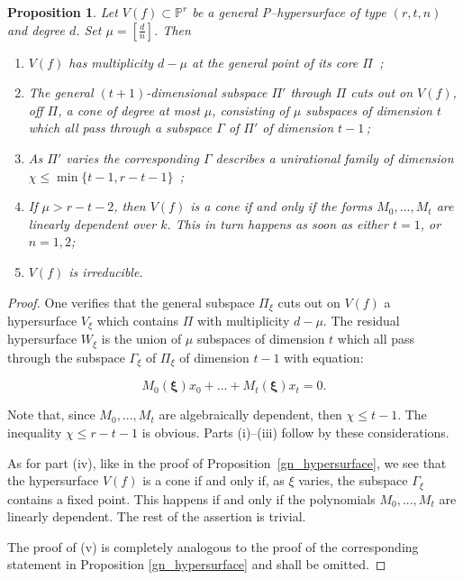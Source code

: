 \documentclass[11pt]{article}   %
\newtheorem{Proposition}[Theorem]{Proposition}
\theoremstyle{definition}
\numberwithin{Theorem}{section} \numberwithin{equation}{section}
\newcommand{\p}{{\mathbb P}}
\begin{document}
{\begin{Proposition}\label{Pcarat} Let $V(f)\subset\p^r$ be a general {\rm P}--hypersurface
of type $(r,t,n)$ and degree $d$. Set $\mu= [\frac dn]$. Then
\begin{enumerate}
\item[{\rm (i)}] $V(f)$ has multiplicity  $d-\mu$ at the general point
of its core $\Pi \,$ {\rm ;}
\item[{\rm (ii)}]  The general $(t+1)$-dimensional subspace $\Pi'$ through
$\Pi$ cuts out on $V(f)$, off $\Pi$, a cone of degree at most $\mu$,
consisting of  $\mu$ subspaces of dimension $t$ which all pass
through a subspace $\Gamma$ of $\Pi'$ of dimension
$t-1\,${\rm ;}
\item[{\rm (iii)}]   As $\Pi'$ varies the corresponding $\Gamma$ describes a
unirational family of dimension $\chi\leq \min\{t-1,r-t-1\}\,${\rm
;}
\item [{\rm (iv)}]  If $\mu>r-t-2$, then $V(f)$ is a cone
if and only if the forms $M_0,...,M_t$ are linearly dependent over
$k$. This in turn happens as soon as either $t=1$, or $n=1,2${\rm ;}
\item [{\rm (v)}] $V(f)$ is
irreducible.
\end{enumerate}
\end{Proposition}


\begin{proof}
One verifies that the general
subspace $\Pi_\xi$ cuts out on $V(f)$ a hypersurface $V_\xi$ which
contains $\Pi$ with multiplicity $d-\mu$. The residual hypersurface
$W_\xi$ is the union of $\mu$ subspaces of dimension $t$ which all
pass through the subspace $\Gamma_\xi$ of $\Pi_\xi$ of dimension
$t-1$ with equation:

$$M_{0}(\mathbf{\xi})x_0+...+
M_{t}(\mathbf{\xi})x_t=0.$$

Note that, since $M_0,...,M_t$ are algebraically dependent,
then $\chi\leq t-1$. The inequality $\chi\leq r-t-1$ is
obvious. Parts (i)--(iii) follow by these considerations.

As for part (iv), like in the proof of Proposition~\ref{gn_hypersurface}, we
see that the hypersurface $V(f)$ is a cone if and only if, as $\xi$
varies, the subspace $\Gamma_\xi$ contains a fixed point. This
happens if and only if the polynomials $M_0,...,M_t$ are linearly
dependent. The rest of the assertion is trivial.

The proof of (v) is completely analogous to the proof of the
corresponding statement in Proposition \ref{gn_hypersurface} and
shall be omitted.
\end{proof}


}
\end{document}
